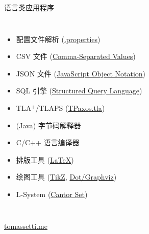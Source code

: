 \begin{frame}{}
  \begin{center}
    {\Large 语言类应用程序}
  \end{center}

  \begin{columns}
      \begin{itemize}
        \setlength{\itemsep}{6pt}
        \item 配置文件解析 (\href{https://en.wikipedia.org/wiki/.properties}{.properties})
        \item CSV 文件 (\href{https://en.wikipedia.org/wiki/Comma-separated_values\#/media/File:CsvDelimited001.svg}{Comma-Separated Values})
        \item JSON 文件 (\href{https://en.wikipedia.org/wiki/JSON\#Syntax}{JavaScript Object Notation})
        \vspace{8pt}
        \pause
        \item SQL 引擎 (\href{https://en.wikipedia.org/wiki/SQL_syntax}{Structured Query Language})
        \item TLA$^{+}$/TLAPS (\href{https://github.com/Starydark/PaxosStore-tla/blob/master/theorem\%20proving/TPaxos.tla}{TPaxos.tla})
        \item (Java) 字节码解释器
        \item C/C++ 语言编译器
        \vspace{8pt}
        \pause
        \item 排版工具 (\href{https://github.com/courses-at-nju-by-hfwei/compilers-lectures/blob/master/2021/0-overview/parts/overview.tex}{\LaTeX})
        \item 绘图工具 (\href{https://www.overleaf.com/learn/latex/TikZ_package}{TikZ},
          \href{https://renenyffenegger.ch/notes/tools/Graphviz/examples/index}{Dot/Graphviz})
        \pause
        \item L-System (\href{https://en.wikipedia.org/wiki/L-system\#Example_3:_Cantor_set}{Cantor Set})
      \end{itemize}
  \end{columns}
\end{frame}

\begin{frame}{}

  \begin{center}
    \href{https://tomassetti.me/}{tomassetti.me}
  \end{center}
\end{frame}

